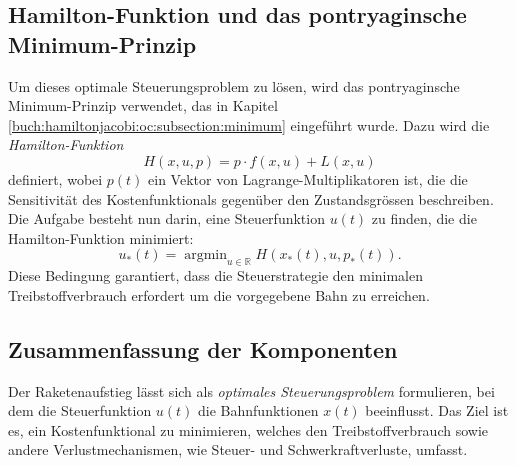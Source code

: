 \subsection{Hamilton-Funktion und das pontryaginsche Minimum-Prinzip}

Um dieses optimale Steuerungsproblem zu lösen, wird das pontryaginsche Minimum-Prinzip verwendet, das in Kapitel \ref{buch:hamiltonjacobi:oc:subsection:minimum} eingeführt wurde.
%
%
Dazu wird die \textit{Hamilton-Funktion}
%
\[
H(x,u,p) = p \cdot f(x,u) + L(x,u)
\]
definiert,
wobei \(p(t)\) ein Vektor von Lagrange-Multiplikatoren ist, die die Sensitivität des Kostenfunktionals gegenüber den Zustandsgrössen beschreiben. Die Aufgabe besteht nun darin, eine Steuerfunktion \(u(t)\) zu finden, die die Hamilton-Funktion minimiert:
%
\[
u_*(t) = \operatorname{argmin}_{u \in \mathbb{R}} H(x_*(t), u, p_*(t)).
\]
Diese Bedingung garantiert, dass die Steuerstrategie den minimalen Treibstoffverbrauch erfordert um die vorgegebene Bahn zu erreichen.

\subsection{Zusammenfassung der Komponenten}
%
%

Der Raketenaufstieg lässt sich als \textit{optimales Steuerungsproblem} formulieren, bei dem die Steuerfunktion \( u(t) \) die Bahnfunktionen \( x(t) \) beeinflusst. 
Das Ziel ist es, ein Kostenfunktional zu minimieren, welches den Treibstoffverbrauch sowie andere Verlustmechanismen, wie Steuer- und Schwerkraftverluste, umfasst.

